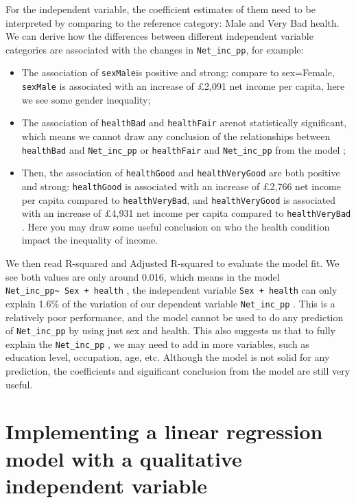 \documentclass[
  letterpaper,
  DIV=11,
  numbers=noendperiod]{scrreprt}
\providecommand{\tightlist}{%
  \setlength{\itemsep}{0pt}\setlength{\parskip}{0pt}}\usepackage{longtable,booktabs,array}
\begin{document}
For the independent variable, the coefficient estimates of them need to
be interpreted by comparing to the reference category: Male and Very Bad
health. We can derive how the differences between different independent
variable categories are associated with the changes in
\texttt{Net\_inc\_pp}, for example:

\begin{itemize}
\tightlist
\item
  The association of \texttt{sexMale}is positive and strong: compare to
  sex=Female, \texttt{sexMale} is associated with an increase of £2,091
  net income per capita, here we see some gender inequality;
\item
  The association of \texttt{healthBad} and \texttt{healthFair} arenot
  statistically significant, which means we cannot draw any conclusion
  of the relationships between \texttt{healthBad} and
  \texttt{Net\_inc\_pp} or \texttt{healthFair} and \texttt{Net\_inc\_pp}
  from the model ;
\item
  Then, the association of \texttt{healthGood} and
  \texttt{healthVeryGood} are both positive and strong:
  \texttt{healthGood} is associated with an increase of £2,766 net
  income per capita compared to \texttt{healthVeryBad}, and
  \texttt{healthVeryGood} is associated with an increase of £4,931 net
  income per capita compared to \texttt{healthVeryBad} . Here you may
  draw some useful conclusion on who the health condition impact the
  inequality of income.
\end{itemize}

We then read R-squared and Adjusted R-squared to evaluate the model fit.
We see both values are only around 0.016, which means in the model
\texttt{Net\_inc\_pp\textasciitilde{}\ Sex\ +\ health} , the independent
variable \texttt{Sex\ +\ health} can only explain 1.6\% of the variation
of our dependent variable \texttt{Net\_inc\_pp} . This is a relatively
poor performance, and the model cannot be used to do any prediction of
\texttt{Net\_inc\_pp} by using just sex and health. This also suggests
us that to fully explain the \texttt{Net\_inc\_pp} , we may need to add
in more variables, such as education level, occupation, age, etc.
Although the model is not solid for any prediction, the coefficients and
significant conclusion from the model are still very useful.

\section{\texorpdfstring{\textbf{Implementing a linear regression model
with a qualitative independent
variable}}{Implementing a linear regression model with a qualitative independent variable}}\label{implementing-a-linear-regression-model-with-a-qualitative-independent-variable}
\end{document}
